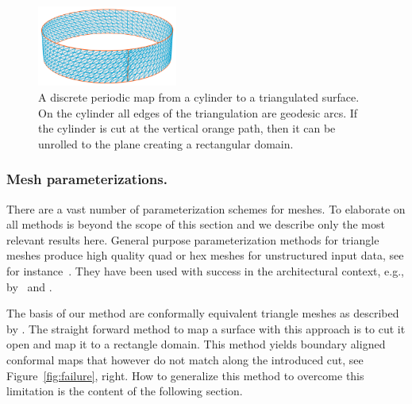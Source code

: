 \documentclass[article.tex]{subfiles}
\begin{document}
\begin{figure}[tb]
\centering
\includegraphics[width=0.41\textwidth]{images/discrete_map_cylinder.png}
\caption{A discrete periodic map from a cylinder to a triangulated
  surface.  On the cylinder all edges of the triangulation are
  geodesic arcs. If the cylinder is cut at the vertical orange path,
  then it can be unrolled to the plane creating a rectangular domain.}
\label{fig:discrete_map}
\end{figure}

\subsubsection{Mesh parameterizations.}
There are a vast number of parameterization schemes for meshes. To
elaborate on all methods is beyond the scope of this section and we
describe only the most relevant results here. General purpose
parameterization methods for triangle meshes produce high quality quad
or hex meshes for unstructured input data, see for
instance~\cite{Bommes2009, ARAP, SSP08}. They have been used with
success in the architectural context, e.g., by~\cite{bo-2011-cas} and
\cite{SRB12}.

The basis of our method are conformally equivalent triangle meshes as
described by \cite{SSP08}. The straight forward method to map a
surface with this approach is to cut it open and map it to a rectangle
domain. This method yields boundary aligned conformal maps that
however do not match along the introduced cut, see
Figure~\ref{fig:failure}, right. How to generalize this method to
overcome this limitation is the content of the following section.

\subfilebibliography
\end{document}

